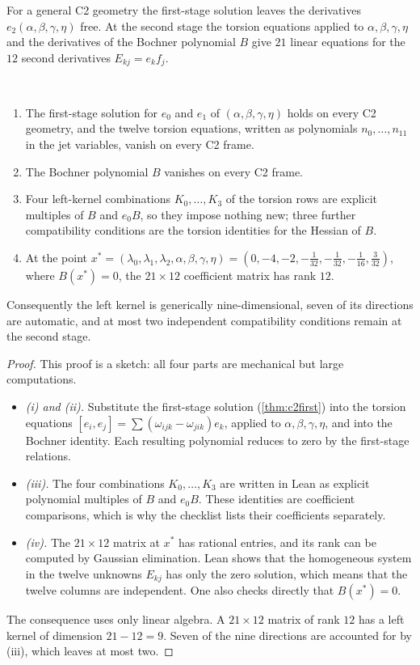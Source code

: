 For a general C2 geometry the first-stage solution leaves the derivatives $e_2(\alpha,\beta,\gamma,\eta)$ free. At the second stage the torsion equations applied to $\alpha,\beta,\gamma,\eta$ and the derivatives of the Bochner polynomial $B$ give $21$ linear equations for the $12$ second derivatives $E_{kj}=e_kf_j$.

\begin{theorem}\label{thm:secondstage}\ver\
\begin{enumerate}[label=(\roman*)]
\item The first-stage solution for $e_0$ and $e_1$ of $(\alpha,\beta,\gamma,\eta)$ holds on every C2 geometry, and the twelve torsion equations, written as polynomials $n_0,\dots,n_{11}$ in the jet variables, vanish on every C2 frame.
\item The Bochner polynomial $B$ vanishes on every C2 frame.
\item Four left-kernel combinations $K_0,\dots,K_3$ of the torsion rows are explicit multiples of $B$ and $e_0B$, so they impose nothing new; three further compatibility conditions are the torsion identities for the Hessian of $B$.
\item At the point $x^*=(\lambda_0,\lambda_1,\lambda_2,\alpha,\beta,\gamma,\eta)=(0,-4,-2,-\frac1{32},-\frac1{32},-\frac1{16},\frac3{32})$, where $B(x^*)=0$, the $21\times12$ coefficient matrix has rank $12$.
\end{enumerate}
Consequently the left kernel is generically nine-dimensional, seven of its directions are automatic, and at most two independent compatibility conditions remain at the second stage.
\end{theorem}
\begin{proof}
This proof is a sketch: all four parts are mechanical but large computations.
\begin{itemize}
\item \emph{(i) and (ii).} Substitute the first-stage solution (\cref{thm:c2first}) into the torsion equations $[e_i,e_j]=\sum(\omega_{ijk}-\omega_{jik})e_k$, applied to $\alpha,\beta,\gamma,\eta$, and into the Bochner identity. Each resulting polynomial reduces to zero by the first-stage relations.
\item \emph{(iii).} The four combinations $K_0,\dots,K_3$ are written in Lean as explicit polynomial multiples of $B$ and $e_0B$. These identities are coefficient comparisons, which is why the checklist lists their coefficients separately.
\item \emph{(iv).} The $21\times12$ matrix at $x^*$ has rational entries, and its rank can be computed by Gaussian elimination. Lean shows that the homogeneous system in the twelve unknowns $E_{kj}$ has only the zero solution, which means that the twelve columns are independent. One also checks directly that $B(x^*)=0$.
\end{itemize}
The consequence uses only linear algebra. A $21\times12$ matrix of rank $12$ has a left kernel of dimension $21-12=9$. Seven of the nine directions are accounted for by (iii), which leaves at most two.
\end{proof}


